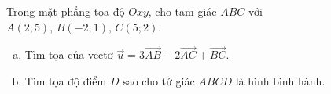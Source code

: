 \begin{bt}%
	Trong mặt phẳng tọa độ $Oxy$, cho tam giác $ABC$ với $A(2;5),\, B(-2;1),\, C(5;2)$.
	\begin{enumerate}[a)]
		\item Tìm tọa của vectơ $\overrightarrow{u} = 3\overrightarrow{AB} - 2\overrightarrow{AC} + \overrightarrow{BC}$.
		\item Tìm tọa độ điểm $D$ sao cho tứ giác $ABCD$ là hình bình hành.
	\end{enumerate}
\end{bt}


